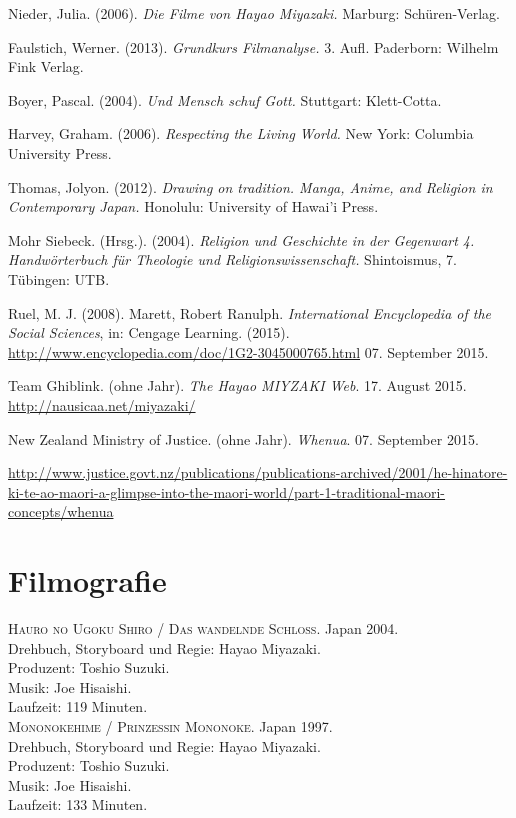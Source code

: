 \documentclass[a4paper]{article}
\begin{document}
\newpage
\begin{thebibliography}{9}

	Nieder, Julia. 
	(2006). 
	\emph{Die Filme von Hayao Miyazaki.}
	Marburg: Schüren-Verlag.

	Faulstich, Werner.
	(2013).
	\emph{Grundkurs Filmanalyse.} 
	3. Aufl. 
	Paderborn: Wilhelm Fink Verlag.

	Boyer, Pascal.
	(2004).
	\emph{Und Mensch schuf Gott.}
	Stuttgart: Klett-Cotta.

	Harvey, Graham.
	(2006).
	\emph{Respecting the Living World.}
	New York: Columbia University Press.

	Thomas, Jolyon.
	(2012).
	\emph{Drawing on tradition. Manga, Anime, and Religion in Contemporary Japan.}
	Honolulu: University of Hawai'i Press.

	Mohr Siebeck. (Hrsg.). (2004).
	\emph{Religion und Geschichte in der Gegenwart 4. Handwörterbuch für Theologie und Religionswissenschaft.} 
	Shintoismus, 7.
	Tübingen: UTB.


	Ruel, M. J. 
	(2008). 
	\glqq Marett, Robert Ranulph\grqq. \emph{International Encyclopedia of the Social Sciences}, in: Cengage Learning. (2015). \url{http://www.encyclopedia.com/doc/1G2-3045000765.html} 07. September 2015.

	Team Ghiblink. 
	(ohne Jahr). 
	\emph{The Hayao MIYZAKI Web}. 
	17. August 2015. 
	\url{http://nausicaa.net/miyazaki/}

	New Zealand Ministry of Justice.
	(ohne Jahr).
	\emph{Whenua}.
	07. September 2015.

	
	\url{http://www.justice.govt.nz/publications/publications-archived/2001/he-hinatore-ki-te-ao-maori-a-glimpse-into-the-maori-world/part-1-traditional-maori-concepts/whenua}	

\section*{Filmografie}

	\textsc{Hauro no Ugoku Shiro / Das wandelnde Schloss}.
	Japan 2004. \\
	Drehbuch, Storyboard und Regie: Hayao Miyazaki.\\
	Produzent: Toshio Suzuki. \\
	Musik: Joe Hisaishi. \\
	Laufzeit: 119 Minuten. \\

	\textsc{Mononokehime / Prinzessin Mononoke}.
	Japan 1997. \\
	Drehbuch, Storyboard und Regie: Hayao Miyazaki.\\
	Produzent: Toshio Suzuki. \\
	Musik: Joe Hisaishi. \\
	Laufzeit: 133 Minuten. \\

\end{thebibliography}
\end{document}
